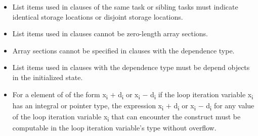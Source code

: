 \begin{itemize}
\item List items used in  clauses of the same task or 
      sibling tasks must indicate identical storage locations or 
      disjoint storage locations.
\item List items used in  clauses cannot be zero-length array sections.
\item Array sections cannot be specified in  clauses 
      with the  dependence type.
\item List items used in  clauses with the  
      dependence type must be depend objects in the initialized state.



\item For a  element of   of the form
      x\textsubscript{i} $+$ d\textsubscript{i} or 
      x\textsubscript{i} $-$ d\textsubscript{i} if the loop iteration variable
      x\textsubscript{i} has an integral or pointer type, the expression 
      x\textsubscript{i} $+$ d\textsubscript{i} or
      x\textsubscript{i} $-$ d\textsubscript{i} for any value of the loop 
      iteration variable x\textsubscript{i} that can encounter the  
      construct must be computable in the loop iteration variable's type 
      without overflow.


\end{itemize}
